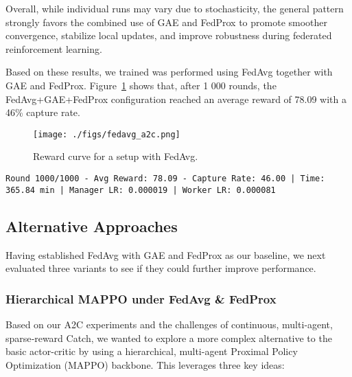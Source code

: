 \documentclass[12pt,a4paper,twoside,openany]{book}
\begin{document}
Overall, while individual runs may vary due to stochasticity, the general pattern strongly favors the combined use of GAE and FedProx to promote smoother convergence, stabilize local updates, and improve robustness during federated reinforcement learning.

Based on these results, we trained was performed using FedAvg together with GAE and FedProx. Figure~\ref{fig:fedavg_a2c} shows that, after 1 000 rounds, the FedAvg+GAE+FedProx configuration reached an average reward of 78.09 with a 46\% capture rate.

\begin{figure}[H]
\centering
\texttt{[image: ./figs/fedavg\_a2c.png]}
\captionsetup{font=small}
\caption{Reward curve for a setup with FedAvg.}
\label{fig:fedavg_a2c}
\end{figure}

\begin{lstlisting}
Round 1000/1000 - Avg Reward: 78.09 - Capture Rate: 46.00 | Time: 365.84 min | Manager LR: 0.000019 | Worker LR: 0.000081
\end{lstlisting}


\subsection{Alternative Approaches}

Having established FedAvg with GAE and FedProx as our baseline, we next evaluated three variants to see if they could further improve performance.

\subsubsection{Hierarchical MAPPO under FedAvg \& FedProx}

Based on our A2C experiments and the challenges of continuous, multi‐agent, sparse‐reward Catch, we wanted to explore a more complex alternative to the basic actor-critic by using a hierarchical, multi-agent Proximal Policy Optimization (MAPPO) backbone. This leverages three key ideas:
\end{document}
